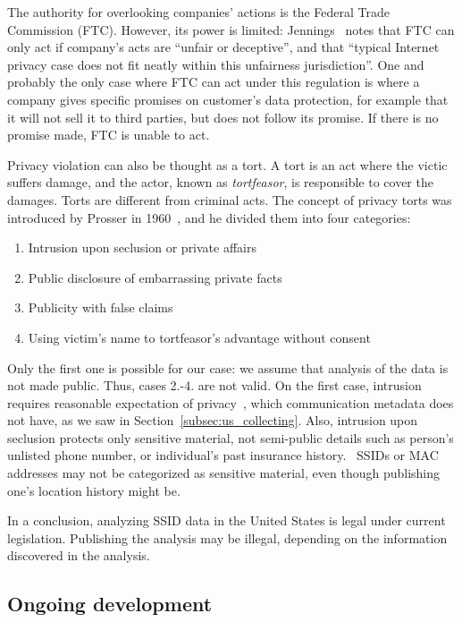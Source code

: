 \documentclass[12pt,a4paper,oneside,pdftex]{report}
\begin{document}
The authority for overlooking companies' actions is the Federal Trade Commission (FTC). However, its power is limited: Jennings~\cite{jennings2012track} notes that FTC can only act if company's acts are ``unfair or deceptive'', and that ``typical Internet privacy case does not fit neatly within this unfairness jurisdiction''. One and probably the only case where FTC can act under this regulation is where a company gives specific promises on customer's data protection, for example that it will not sell it to third parties, but does not follow its promise. If there is no promise made, FTC is unable to act.~\cite{jennings2012track}

Privacy violation can also be thought as a tort. A tort is an act where the victic suffers damage, and the actor, known as \emph{tortfeasor}, is responsible to cover the damages. Torts are different from criminal acts. The concept of privacy torts was introduced by Prosser in 1960~\cite{prosser196048calif}, and he divided them into four categories:

\begin{enumerate}
    \item Intrusion upon seclusion or private affairs
    \item Public disclosure of embarrassing private facts
    \item Publicity with false claims
    \item Using victim's name to tortfeasor's advantage without consent
\end{enumerate}

Only the first one is possible for our case: we assume that analysis of the data is not made public. Thus, cases 2.-4. are not valid. On the first case, intrusion requires reasonable expectation of privacy~\cite{yeatesprivacy}, which communication metadata does not have, as we saw in Section~\ref{subsec:us_collecting}. Also, intrusion upon seclusion protects only sensitive material, not semi-public details such as person's unlisted phone number, or individual's past insurance history.~\cite{evans2012s} SSIDs or MAC addresses may not be categorized as sensitive material, even though publishing one's location history might be.

In a conclusion, analyzing SSID data in the United States is legal under current legislation. Publishing the analysis may be illegal, depending on the information discovered in the analysis.

\subsection{Ongoing development}
\end{document}
